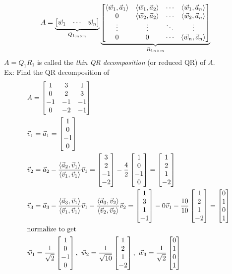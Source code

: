 \documentclass[11pt, fleqn]{article}
\begin{document}
\begin{align*}
    &A=\underbrace{{\matrixx{\vec{w}_1 & \cdots & \vec{w}_n}}}_{{Q_1}_{m\times n}}\underbrace{\matrixx{\brangle{\vec{w}_1,\vec{a}_1} & \brangle{\vec{w}_1,\vec{a}_2} & \cdots & \brangle{\vec{w}_1,\vec{a}_n}\\ 0 & \brangle{\vec{w}_2,\vec{a}_2} & \cdots & \brangle{\vec{w}_2,\vec{a}_n}\\ \vdots & \vdots & \ddots & \vdots\\ 0 & 0 & \cdots & \brangle{\vec{w}_n,\vec{a}_n}}}_{{R_1}_{n\times m}}
\end{align*}
$A=Q_1R_1$ is called the \textit{thin QR decomposition} (or reduced QR) of $A$.\\
Ex: Find the QR decomposition of
\begin{align*}
    &A=\matrixx{1 & 3 & 1\\ 0 & 2 & 3\\ -1 & -1 & -1\\ 0 & -2 & -1}\\
    &\vec{v}_1=\vec{a}_1=\matrixx{1\\0\\-1\\0}\\
    &\vec{v}_2=\vec{a}_2-\frac{\brangle{\vec{a}_2,\vec{v}_1}}{\brangle{\vec{v}_1,\vec{v}_1}}\vec{v}_1=\matrixx{3\\2\\-1\\-2}-\frac{4}{2}\matrixx{1\\0\\-1\\0}=\matrixx{1\\2\\1\\-2}\\
    &\vec{v}_3=\vec{a}_3-\frac{\brangle{\vec{a}_3,\vec{v}_1}}{\brangle{\vec{v}_1,\vec{v}_1}}\vec{v}_1-\frac{\brangle{\vec{a}_3,\vec{v}_2}}{\brangle{\vec{v}_2,\vec{v}_2}}\vec{v}_2=\matrixx{1\\3\\1\\-1}-0\vec{v}_1-\frac{10}{10}\matrixx{1\\2\\1\\-2}=\matrixx{0\\1\\0\\1}\\
    &\text{normalize to get}\\
    &\vec{w}_1=\frac{1}{\sqrt{2}}\matrixx{1\\0\\-1\\0},\ \vec{w}_2=\frac{1}{\sqrt{10}}\matrixx{1\\2\\1\\-2},\ \vec{w}_3=\frac{1}{\sqrt{2}}\matrixx{0\\1\\0\\1}\\

\end{align*}
\end{document}
